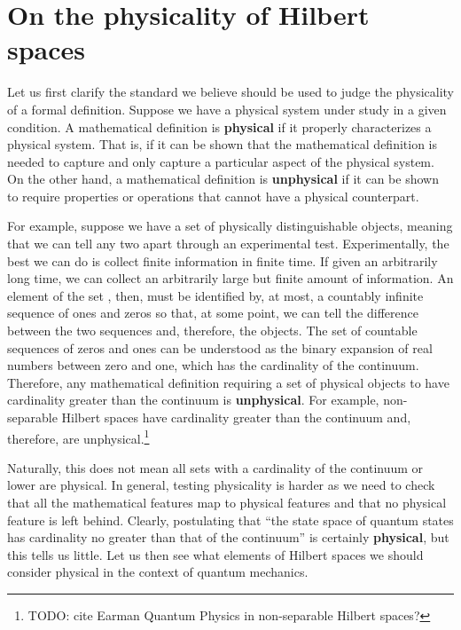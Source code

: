 \documentclass[10pt,twocolumn, nofootinbib]{revtex4-2}
\begin{document}
\section{On the physicality of Hilbert spaces}

Let us first clarify the standard we believe should be used to judge the physicality of a formal definition. Suppose we have a physical system under study in a given condition. A mathematical definition is \textbf{physical} if it properly characterizes a physical system. That is, if it can be shown that the mathematical definition is needed to capture and only capture a particular aspect of the physical system. On the other hand, a mathematical definition is \textbf{unphysical} if it can be shown to require properties or operations that cannot have a physical counterpart.

For example, suppose we have a set of physically distinguishable objects, meaning that we can tell any two apart through an experimental test. Experimentally, the best we can do is collect finite information in finite time. If given an arbitrarily long time, we can collect an arbitrarily large but finite amount of information. An element of the set%
, then, must be identified by, at most, a countably infinite sequence of ones and zeros so that, at some point, we can tell the difference between the two sequences and, therefore, the objects. The set of countable sequences of zeros and ones can be understood as the binary expansion of real numbers between zero and one, which has the cardinality of the continuum. Therefore, any mathematical definition requiring a set of physical objects to have cardinality greater than the continuum is \textbf{unphysical}. For example, non-separable Hilbert spaces have cardinality greater than the continuum and, therefore, are unphysical.\footnote{TODO: cite Earman Quantum Physics in non-separable Hilbert spaces?}

Naturally, this does not mean all sets with a cardinality of the continuum or lower are physical. In general, testing physicality is harder as we need to check that all the mathematical features map to physical features and that no physical feature is left behind. Clearly, postulating that ``the state space of quantum states has cardinality no greater than that of the continuum'' is certainly \textbf{physical}, but this tells us little. Let us then see what elements of Hilbert spaces we should consider physical in the context of quantum mechanics. %
\end{document}

